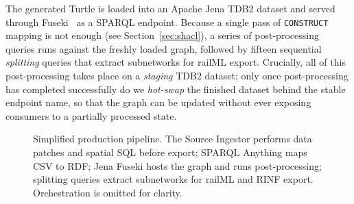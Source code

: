 \documentclass{ceurart}
\begin{document}
The generated Turtle is loaded into an Apache Jena TDB2 dataset and served
through Fuseki~\cite{jena} as a SPARQL endpoint. Because a single pass of
\texttt{CONSTRUCT} mapping is not enough (see Section~\ref{sec:shacl}), a series
of post-processing queries runs against the freshly loaded graph, followed by
fifteen sequential \emph{splitting} queries that extract subnetworks for railML
export. Crucially, all of this post-processing takes place on a \emph{staging}
TDB2 dataset; only once post-processing has completed successfully do we
\emph{hot-swap} the finished dataset behind the stable endpoint name, so that the
graph can be updated without ever exposing consumers to a partially processed
state.

\begin{figure}[t]
  \centering
  \caption{Simplified production pipeline. The Source Ingestor performs data
    patches and spatial SQL before export; SPARQL Anything maps CSV to RDF;
    Jena Fuseki hosts the graph and runs post-processing; splitting queries
    extract subnetworks for railML and RINF export. Orchestration is omitted
    for clarity.}
  \label{fig:pipeline}
\end{figure}
\end{document}
